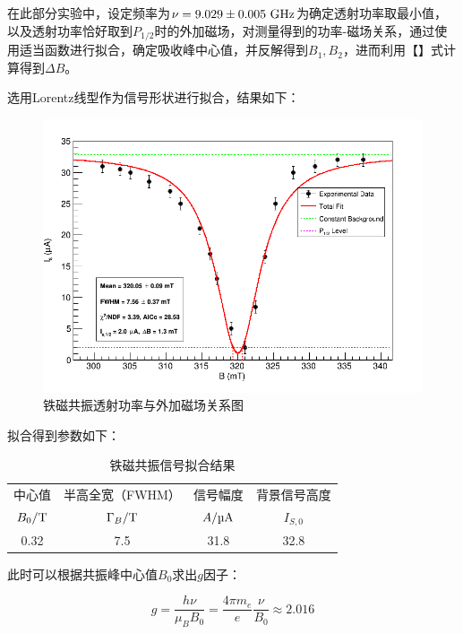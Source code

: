\documentclass{thuemp}
\begin{document}
在此部分实验中，设定频率为$\nu = 9.029 \pm 0.005~\text{\si{\giga \hertz}}$为确定透射功率取最小值，以及透射功率恰好取到$P_{1/2}$时的外加磁场，对测量得到的功率-磁场关系，通过使用适当函数进行拟合，确定吸收峰中心值，并反解得到$B_1, B_2$，进而利用【】式计算得到$\Delta B$。

选用Lorentz线型作为信号形状进行拟合，结果如下：

\begin{figure}[H]
    \centering
    \includegraphics[width=0.9\linewidth]{../Data/FMR_ConstantBg_LorentzPeak.png}
    \caption{铁磁共振透射功率与外加磁场关系图} \label{fig:gmr_gradient}
\end{figure}

拟合得到参数如下：

\begin{table}[H]
    \centering
    \captionnamefont{\wuhao\bf\heiti}
    \captiontitlefont{\wuhao\bf\heiti}
    \caption{铁磁共振信号拟合结果} \label{tab:FMR_fit}
    \liuhao
    \begin{tabular}{cccc}
        \toprule
        中心值 & 半高全宽（FWHM） & 信号幅度 & 背景信号高度 \\
        $B_0/\text{\si\tesla}$ & $\Gamma_B/\text{\si\tesla}$ & $A/\text{\si{\micro\ampere}}$ & $I_{S,0}$\\
        \midrule
        0.32 & 7.5 & 31.8 & 32.8 \\
        \bottomrule
    \end{tabular}
\end{table}

此时可以根据共振峰中心值$B_0$求出$g$因子：

\begin{equation}
g = \frac{h \nu}{\mu_B B_0} = \frac{4\pi m_e}{e} \frac{\nu}{B_0}\approx 2.016
\end{equation}
\end{document}
